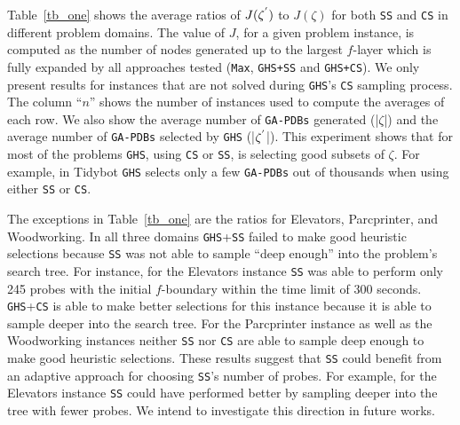 Table~\ref{tb_one} shows the average ratios of $J(\zeta\sp{'})$ to $J(\zeta)$ for both \texttt{SS} and \texttt{CS} in different problem domains. The value of $J$, for a given problem instance, is computed as the number of nodes generated up to the largest $f$-layer which is fully expanded by all approaches tested (\texttt{Max}, \texttt{GHS+SS} and \texttt{GHS+CS}). We only present results for instances that are not solved during \texttt{GHS}'s \texttt{CS} sampling process. The column ``$n$'' shows the number of instances used to compute the averages of each row. We also show the average number of \texttt{GA-PDBs} generated (|$\zeta$|) and the average number of \texttt{GA-PDBs} selected by \texttt{GHS} (|$\zeta\sp{'}$|). This experiment shows that for most of the problems \texttt{GHS}, using \texttt{CS} or \texttt{SS}, is selecting good subsets of $\zeta$. For example, in Tidybot \texttt{GHS} selects only a few \texttt{GA-PDBs} out of thousands when using either \texttt{SS} or \texttt{CS}.


The exceptions in Table~\ref{tb_one} are the ratios for Elevators, Parcprinter, and Woodworking. In all three domains \texttt{GHS}+\texttt{SS} failed to make good heuristic selections because \texttt{SS} was not able to sample ``deep enough'' into the problem's search tree. For instance, for the Elevators instance \texttt{SS} was able to perform only 245 probes with the initial $f$-boundary within the time limit of 300 seconds. \texttt{GHS}+\texttt{CS} is able to make better selections for this instance because it is able to sample deeper into the search tree. For the Parcprinter instance as well as the Woodworking instances neither \texttt{SS} nor \texttt{CS} are able to sample deep enough to make good heuristic selections. These results suggest that \texttt{SS} could benefit from an adaptive approach for choosing \texttt{SS}'s number of probes. For example, for the Elevators instance \texttt{SS} could have performed better by sampling deeper into the tree with fewer probes. We intend to investigate this direction in future works.


